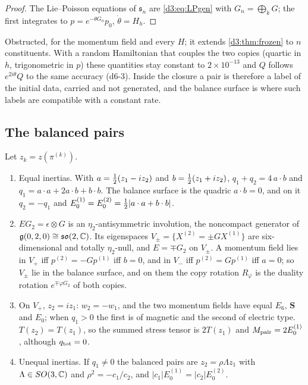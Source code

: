\begin{proof}
The Lie--Poisson equations of $\mathfrak s_n$ are \eqref{d3:eq:LPgen} with $G_n=\bigoplus_kG$; the first integrates to $p=e^{-\theta G_n}p_0$,
$\dot\theta=H_h$.
\end{proof}

Obstructed, for the momentum field and every $H$; it extends \cref{d3:thm:frozen} to $n$ constituents. With a random Hamiltonian that couples
the two copies (quartic in $h$, trigonometric in $p$) these quantities stay constant to $2\times10^{-13}$ and $Q$ follows $e^{2i\theta}Q$ to the
same accuracy (d6-3). Inside the closure a pair is therefore a label of the initial data, carried and not generated, and the balance surface is
where such labels are compatible with a constant rate.

\subsection{The balanced pairs}
\label{d6:sec:pairs}

\begin{proposition}
\label{d6:prop:pairs}
Let $z_k=z(\pi^{(k)})$.
\begin{enumerate}[label=(\roman*),leftmargin=2.2em]
\item Equal inertias. With $a=\tfrac12(z_1-iz_2)$ and $b=\tfrac12(z_1+iz_2)$, $q_1+q_2=4\,a\cdot b$ and $q_1=a\cdot a+2a\cdot b+b\cdot b$. The balance
surface is the quadric $a\cdot b=0$, and on it $q_2=-q_1$ and $E_0^{(1)}=E_0^{(2)}=\tfrac12|a\cdot a+b\cdot b|$.
\item $EG_2=\epsilon\otimes G$ is an $\eta_2$-antisymmetric involution, the noncompact generator of $\mathfrak g(0,2,0)\cong\mathfrak{so}(2,\mathbb{C})$. Its
eigenspaces $V_\pm=\{X^{(2)}=\pm GX^{(1)}\}$ are six-dimensional and totally $\eta_2$-null, and $E=\mp G_2$ on $V_\pm$. A momentum field lies in
$V_+$ iff $p^{(2)}=-Gp^{(1)}$ iff $b=0$, and in $V_-$ iff $p^{(2)}=Gp^{(1)}$ iff $a=0$; so $V_\pm$ lie in the balance surface, and on them the
copy rotation $R_\varphi$ is the duality rotation $e^{\mp\varphi G_2}$ of both copies.
\item On $V_+$, $z_2=iz_1$: $w_2=-w_1$, and the two momentum fields have equal $E_6$, $\mathbf S$ and $E_0$; when $q_1>0$ the first is of
magnetic and the second of electric type. $T(z_2)=T(z_1)$, so the summed stress tensor is $2T(z_1)$ and $M_{\rm pair}=2E_0^{(1)}$, although
$q_{\rm tot}=0$.
\item Unequal inertias. If $q_1\neq0$ the balanced pairs are $z_2=\rho\Lambda z_1$ with $\Lambda\in SO(3,\mathbb{C})$ and $\rho^2=-c_1/c_2$, and
$|c_1|E_0^{(1)}=|c_2|E_0^{(2)}$.
\end{enumerate}
\end{proposition}


